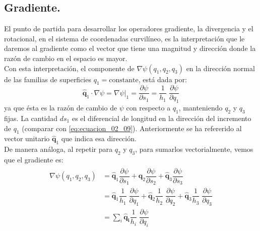 \subsection{Gradiente.} 
El punto de partida para desarrollar los operadores gradiente, la divergencia y el rotacional, en el sistema de coordenadas curvilíneo, es la interpretación que le daremos al gradiente como el vector que tiene una magnitud y dirección donde la razón de cambio en el espacio es mayor.
\\
Con esta interpretación, el componente de $\nabla \psi(q_{1},q_{2},q_{3})$ en la dirección normal de las familias de superficies $q_{1} = \text{constante}$, está dada por:
\begin{equation}
\mathbf{\widehat{q}}_{1} \cdot \nabla \psi = \nabla \psi \big\vert_{1} = \dfrac{\partial \psi}{\partial s_{1}} = \dfrac{1}{h_{1}} \; \dfrac{\partial \psi}{\partial q_{1}}
\label{eq:ecuacion_02_17}
\end{equation}
ya que ésta es la razón de cambio de $\psi$ con respecto a $q_{1}$, manteniendo $q_{2}$ y $q_{3}$ fijas. La cantidad $ds_{1}$ es el diferencial de longitud en la dirección del incremento de $q_{1}$ (comparar con \ref{eq:ecuacion_02_09}). Anteriormente se ha refererido al vector unitario $\mathbf{\widehat{q}}_{1}$ que indica esa dirección.
\\
De manera análoga, al repetir para $q_{2}$ y $q_{3}$, para sumarlos vectorialmente, vemos que el gradiente es:
\begin{eqnarray}
\begin{aligned}
\nabla \psi (q_{1},q_{2},q_{3}) &= \mathbf{\widehat{q}}_{1} \dfrac{\partial \psi}{\partial s_{1}} + \mathbf{\widehat{q}}_{2} \dfrac{\partial \psi}{\partial s_{2}} + \mathbf{\widehat{q}}_{3} \dfrac{\partial \psi}{\partial s_{3}} \\
&= \mathbf{\widehat{q}}_{1} \dfrac{1}{h_{1}} \; \dfrac{\partial \psi}{\partial q_{1}} + \mathbf{\widehat{q}}_{2} \dfrac{1}{h_{2}} \;\dfrac{\partial \psi}{\partial q_{2}} + \mathbf{\widehat{q}}_{3} \dfrac{1}{h_{3}} \; \dfrac{\partial \psi}{\partial q_{3}} \\
&= \sum_{i} \mathbf{\widehat{q}_{i}} \dfrac{1}{h_{i}} \; \dfrac{\partial \psi}{\partial q_{i}}
\label{eq:ecuacion_02_18}
\end{aligned}
\end{eqnarray}
